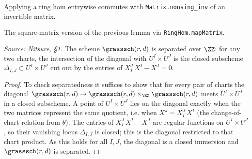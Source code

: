 \begin{lemma}

  \label{lem:grass-map-nonsing-inv}
  Applying a ring hom entrywise commutes with \texttt{Matrix.nonsing\_inv} of an
  invertible matrix.
\end{lemma}

\begin{lemma}

  \label{lem:grass-ringhom-mapmatrix-nonsing-inv}
  The square-matrix version of the previous lemma via \texttt{RingHom.mapMatrix}.
\end{lemma}

\begin{lemma}
  \label{lem:grassmannian-separated}
  \textit{Source: Nitsure, §1.}
  The scheme $\grasssch(r,d)$ is separated over $\ZZ$: for any two charts, the
  intersection of the diagonal with $U^I\times U^J$ is the closed subscheme
  $\Delta_{I,J}\subset U^I\times U^J$ cut out by the entries of
  $X^J_I\,X^I - X^J = 0$.
\end{lemma}

\begin{proof}
  To check separatedness it suffices to show that for every pair of charts the
  diagonal $\grasssch(r,d)\to\grasssch(r,d)\times_\ZZ\grasssch(r,d)$ meets
  $U^I\times U^J$ in a closed subscheme. A point of $U^I\times U^J$ lies on the
  diagonal exactly when the two matrices represent the same quotient, i.e. when
  $X^J = X^J_I\,X^I$ (the change-of-chart relation from $\theta$). The entries of
  $X^J_I\,X^I - X^J$ are regular functions on $U^I\times U^J$, so their vanishing
  locus $\Delta_{I,J}$ is closed; this is the diagonal restricted to that chart
  product. As this holds for all $I,J$, the diagonal is a closed immersion and
  $\grasssch(r,d)$ is separated.
\end{proof}

